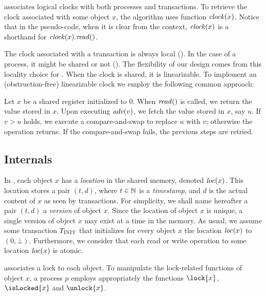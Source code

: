  associates logical clocks with both processes and transactions.
To retrieve the clock associated with some object $x$, the algorithm uses function $\clockOf{x}$.
Notice that in the pseudo-code, when it is clear from the context, $\clockOf{x}$ is a shorthand for $\clockOf{x}.\mathit{read}()$.

The clock associated with a transaction is always local ().
In the case of a process, it might be shared or not ().
The flexibility of our design comes from this locality choice for .
When the clock is shared, it is linearizable.
To implement an (obstruction-free) linearizable clock we employ the following common approach:
\begin{construction}
  Let $x$ be a shared register initialized to $0$.
  When $\cread$ is called, we return the value stored in $x$.
  Upon executing $\cadv(v)$, we fetch the value stored in $x$, say $u$.
  If $v > u$ holds, we execute a compare-and-swap to replace $u$ with $v$; 
  otherwise the operation returns.
  If the compare-and-swap fails, the previous steps are retried.
\end{construction}



\subsection{Internals}

In , each object $x$ has a \emph{location} in the shared memory, denoted $\locationOf{x}$.
This location stores a pair $(t,d)$, where $t \in \naturalSet$ is a \emph{timestamp}, and $d$ is the actual content of $x$ as seen by transactions.
For simplicity, we shall name hereafter a pair $(t,d)$ a \emph{version} of object $x$.
Since the location of object $x$ is unique, a single version of object $x$ may exist at a time in the memory.
As usual, we assume some transaction $\transInit$ that initializes for every object $x$ the location $\locationOf{x}$ to $(0,\bot)$.
Furthermore, we consider that each read or write operation to some location $\locationOf{x}$ is atomic.

 associates a lock to each object.
To manipulate the lock-related functions of object $x$, 
a process $p$ employs appropriately the functions $\lock{x}$, $\isLocked{x}$ and $\unlock{x}$.

